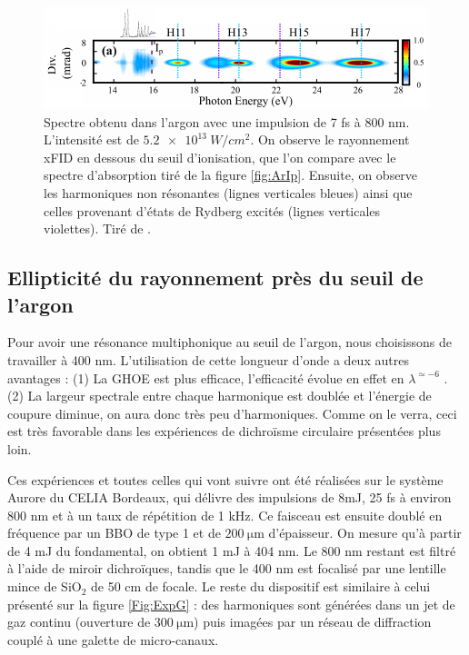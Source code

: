 \begin{figure}[!ht]
\centering
\includegraphics[width=1.1\columnwidth]{Figures/ResonantArgon/xFID.pdf}%
\caption{Spectre obtenu dans l'argon avec une impulsion de 7 fs à 800 nm. L'intensité est de $\SI{5.2e13}{W/cm^2}$. On observe le rayonnement xFID en dessous du seuil d'ionisation, que l'on compare avec le spectre d'absorption tiré de la figure \ref{fig:ArIp}. Ensuite, on observe les harmoniques non résonantes (lignes verticales bleues) ainsi que celles provenant d'états de Rydberg excités (lignes verticales violettes). Tiré de .}
\label{fig:xFID}
\end{figure}



\subsection{Ellipticité du rayonnement près du seuil de l'argon}
\label{sec:resonant_argon_exp}
Pour avoir une résonance multiphonique au seuil de l'argon, nous choisissons de travailler à 400 nm. L'utilisation de cette longueur d'onde a deux autres avantages : (1) La GHOE est plus efficace, l'efficacité évolue en effet en $\lambda^{\simeq-6}$ . (2) La largeur spectrale entre chaque harmonique est doublée et l'énergie de coupure diminue, on aura donc très peu d'harmoniques. Comme on le verra, ceci est très favorable dans les expériences de dichroïsme circulaire présentées plus loin. 

Ces expériences et toutes celles qui vont suivre ont été réalisées sur le système Aurore du CELIA Bordeaux, qui délivre des impulsions de 8mJ, 25 fs à environ 800 nm et à un taux de répétition de 1 kHz. Ce faisceau est ensuite doublé en fréquence par un BBO de type 1 et de $\SI{200}{\micro\meter}$ d'épaisseur. On mesure qu'à partir de 4 mJ du fondamental, on obtient 1 mJ à 404 nm. Le 800 nm restant est filtré à l'aide de miroir dichroïques, tandis que le 400 nm est focalisé par une lentille mince de Si$\text{O}_\text{2}$ de 50 cm de focale. Le reste du dispositif est similaire à celui présenté sur la figure \ref{Fig:ExpG} : des harmoniques sont générées dans un jet de gaz continu (ouverture de $\SI{300}{\micro\meter}$) puis imagées par un réseau de diffraction couplé à une galette de micro-canaux. 

